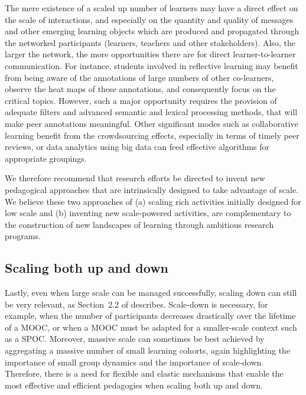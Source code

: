 The mere existence of a scaled up number of learners may have a direct
effect on the scale of interactions, and especially on the quantity and
quality of messages and other emerging learning objects which are
produced and propagated through the networked participants (learners,
teachers and other stakeholders). Also, the larger the network, the more
opportunities there are for direct learner-to-learner communication. For
instance, students involved in reflective learning may benefit from
being aware of the annotations of large numbers of other co-learners,
observe the heat maps of these annotations, and consequently focus on
the critical topics. However, such a major opportunity requires the
provision of adequate filters and advanced semantic and lexical
processing methods, that will make peer annotations meaningful. Other
significant modes such as collaborative learning benefit from the
crowdsourcing effects, especially in terms of timely peer reviews, or
data analytics using big data can feed effective algorithms for
appropriate groupings.

We therefore recommend that research efforts be directed to invent new
pedagogical approaches that are intrinsically designed to take advantage
of scale. We believe these two approaches of (a) scaling rich activities
initially designed for low scale and (b) inventing new scale-powered
activities, are complementary to the construction of new landscapes of
learning through ambitious research programs.

\subsection{Scaling both up and down}

Lastly, even when large scale can be managed successfully, 
scaling down can still be very relevant, as 
Section~2.2 of \cite{mroe-2013-report} describes.
Scale-down is necessary, for example, when the number of
participants decreases drastically over the lifetime of a
MOOC, or when a MOOC must be adapted for a smaller-scale context such as
a SPOC.  
Moreover, massive scale can sometimes be best
achieved by aggregating a massive number of small learning cohorts,
again highlighting the importance of small group dynamics and the
importance of scale-down.
Therefore, there is a need for flexible and
elastic mechanisms that enable the most effective and efficient
pedagogies when scaling both up and down.  

